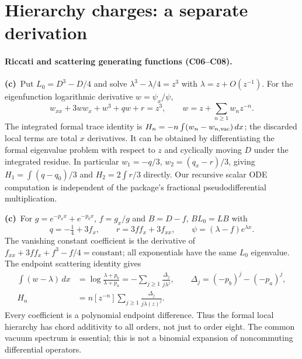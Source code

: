 \documentclass[11pt,a4paper]{article}
\newcommand{\Lc}{\textbf{(c)}\ }
\begin{document}
\section{Hierarchy charges: a separate derivation}
\paragraph{Riccati and scattering generating functions (C06--C08).}
\Lc Put $L_0=D^3-D/4$ and solve $\lambda^3-\lambda/4=z^3$ with
$\lambda=z+O(z^{-1})$. For the eigenfunction logarithmic derivative $w=\psi_x/\psi$,
\begin{equation}
 w_{xx}+3ww_x+w^3+qw+r=z^3,\qquad
 w=z+\sum_{n\ge1}w_n z^{-n}.
 \label{riccati}
\end{equation}
The integrated formal trace identity is
$H_n=-n\int(w_n-w_{n,\rm vac})\,dx$; the discarded local terms are total
$x$ derivatives. It can be obtained by differentiating the formal eigenvalue
problem with respect to $z$ and cyclically moving $D$ under the integrated
residue. In particular $w_1=-q/3$, $w_2=(q_x-r)/3$, giving $H_1=\int(q-q_0)/3$
and $H_2=2\int r/3$ directly. Our recursive scalar ODE computation is independent
of the package's fractional pseudodifferential multiplication.

\Lc For $g=e^{-p_a x}+e^{-p_b x}$, $f=g_x/g$ and $B=D-f$,
$BL_0=LB$ with
\begin{equation}
 q=-\tfrac14+3f_x,\qquad r=3ff_x+3f_{xx},\qquad
 \psi=(\lambda-f)e^{\lambda x}.
\end{equation}
The vanishing constant coefficient is the derivative of
$f_{xx}+3ff_x+f^3-f/4=\text{constant}$; all exponentials have the same
$L_0$ eigenvalue. The endpoint scattering identity gives
\begin{align}
 \int(w-\lambda)\,dx
 &=\log\frac{\lambda+p_b}{\lambda+p_a}
 =-\sum_{j\ge1}\frac{\Delta_j}{j\lambda^j},\qquad
 \Delta_j=(-p_b)^j-(-p_a)^j,\\
 H_n&=n[z^{-n}]\sum_{j\ge1}\frac{\Delta_j}{j\lambda(z)^j}.
 \label{generator}
\end{align}
Every coefficient is a polynomial endpoint difference. Thus the formal local
hierarchy has chord additivity to all orders, not just to order eight.
The common vacuum spectrum is essential; this is not a binomial expansion of
noncommuting differential operators.
\end{document}
